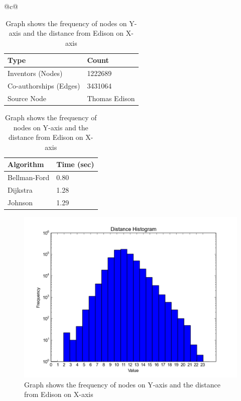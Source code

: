 \begin{table}[t] 
	\scriptsize
  \begin{tabular}{@{}c@{}} 
  \begin{minipage}{0.4\linewidth}
		\begin{center}
	  		\begin{tabular}{| l | l |}
				\hline
				
				{Type} & {Count} \\
				\hline
				\hline
				Inventors (Nodes) & 1222689 \\
				Co-authorships (Edges) & 3431064 \\
				Source Node & Thomas Edison\\
				\hline
			\end{tabular}		
			\caption {\scriptsize Details of the co-authorship graph}
			\label{tab:model}

			\vspace{0.85cm}

			\begin{tabular}{| l | l |}
				\hline
				{Algorithm} & {Time (sec)} \\
				\hline
				\hline
				Bellman-Ford & 0.80 \\
				Dijkstra & 1.28 \\
				Johnson & 1.29 \\
				\hline
			\end{tabular}
			\caption {\scriptsize Performance of the three shortest path algorithms}
			\label{tab:algos}
		\end{center}

  \end{minipage}
  \hspace{0.05\linewidth}
  \begin{minipage}{0.45\linewidth}
      \begin{figure}[H]
          \includegraphics[scale=0.425]{../figures/distance.pdf}
          \caption{\scriptsize Graph shows the frequency of nodes on Y-axis and the distance from
		Edison on X-axis }
	  \label{fig:distance}
      \end{figure}
  \end{minipage}
  \end{tabular}
\end{table}

